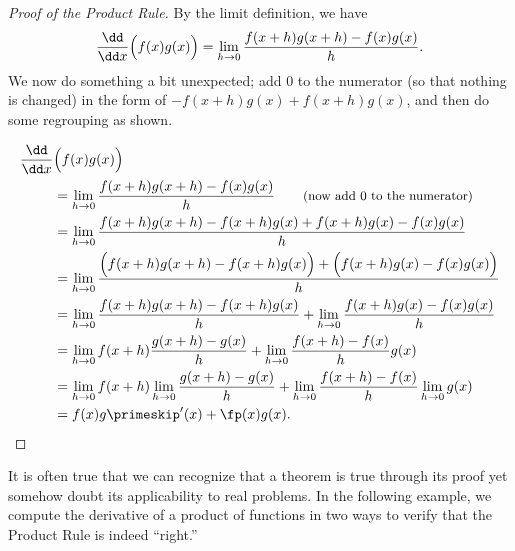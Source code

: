 \begin{proof}[Proof of the Product Rule]
By the limit definition, we have 
\[\frac{\dd}{\dd x}\Bigl(f(x)g(x)\Bigr) =\lim_{h\to0} \frac{f(x+h)g(x+h)-f(x)g(x)}{h}.\]
We now do something a bit unexpected; add 0 to the numerator (so that nothing is changed) in the form of $-f(x+h)g(x)+f(x+h)g(x)$, and then do some regrouping as shown.

\begin{align*}
	\dfrac{\dd}{\dd x}&\Bigl(f(x)g(x)\Bigr) \\
	&=\lim_{h\to0} \frac{f(x+h)g(x+h)-f(x)g(x)}{h}
	\qquad\text{\small(now add 0 to the numerator)}\\
	&=\lim_{h\to0} \frac{f(x+h)g(x+h)-f(x+h)g(x)+f(x+h)g(x)-f(x)g(x)}{h} \\
	&=\lim_{h\to0} \frac{\Bigl(f(x+h)g(x+h)-f(x+h)g(x)\Bigr)+\Bigl(f(x+h)g(x)-f(x)g(x)\Bigr)}{h} \\
	&=\lim_{h\to0} \frac{f(x+h)g(x+h)-f(x+h)g(x)}{h}+\lim_{h\to0}\frac{f(x+h)g(x)-f(x)g(x)}{h} \\ %
	&=\lim_{h\to0} f(x+h)\frac{g(x+h)-g(x)}{h}+\lim_{h\to0}\frac{f(x+h)-f(x)}{h}g(x) \\ %
	&=\lim_{h\to0} f(x+h)\lim_{h\to0}\frac{g(x+h)-g(x)}{h}+\lim_{h\to0}\frac{f(x+h)-f(x)}{h}\lim_{h\to0}g(x) \\ %
	&=f(x)g\primeskip'(x) + \fp(x)g(x).\qedhere
\end{align*}
\end{proof}

It is often true that we can recognize that a theorem is true through its proof yet somehow doubt its applicability to real problems. In the following example, we compute the derivative of a product of functions in two ways to verify that the Product Rule is indeed ``right.''

